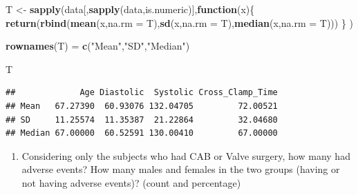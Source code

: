 \documentclass[]{book}
\newenvironment{Shaded}{\begin{snugshade}}{\end{snugshade}}
\newcommand{\CommentTok}[1]{\textcolor[rgb]{0.56,0.35,0.01}{\textit{#1}}}
\newcommand{\ControlFlowTok}[1]{\textcolor[rgb]{0.13,0.29,0.53}{\textbf{#1}}}
\newcommand{\DataTypeTok}[1]{\textcolor[rgb]{0.13,0.29,0.53}{#1}}
\newcommand{\KeywordTok}[1]{\textcolor[rgb]{0.13,0.29,0.53}{\textbf{#1}}}
\newcommand{\NormalTok}[1]{#1}
\newcommand{\OperatorTok}[1]{\textcolor[rgb]{0.81,0.36,0.00}{\textbf{#1}}}
\newcommand{\StringTok}[1]{\textcolor[rgb]{0.31,0.60,0.02}{#1}}
\providecommand{\tightlist}{%
  \setlength{\itemsep}{0pt}\setlength{\parskip}{0pt}}
\begin{document}
\begin{Shaded}
\begin{Highlighting}[]
\NormalTok{T <-}\StringTok{ }\KeywordTok{sapply}\NormalTok{(data[,}\KeywordTok{sapply}\NormalTok{(data,is.numeric)],}\ControlFlowTok{function}\NormalTok{(x)\{}
  \KeywordTok{return}\NormalTok{(}\KeywordTok{rbind}\NormalTok{(}\KeywordTok{mean}\NormalTok{(x,}\DataTypeTok{na.rm =}\NormalTok{ T),}\KeywordTok{sd}\NormalTok{(x,}\DataTypeTok{na.rm =}\NormalTok{ T),}\KeywordTok{median}\NormalTok{(x,}\DataTypeTok{na.rm =}\NormalTok{ T)))}
\NormalTok{  \}}
\NormalTok{  )}

\KeywordTok{rownames}\NormalTok{(T) =}\StringTok{ }\KeywordTok{c}\NormalTok{(}\StringTok{"Mean"}\NormalTok{,}\StringTok{"SD"}\NormalTok{,}\StringTok{"Median"}\NormalTok{)}

\NormalTok{T}
\end{Highlighting}
\end{Shaded}

\begin{verbatim}
##             Age Diastolic  Systolic Cross_Clamp_Time
## Mean   67.27390  60.93076 132.04705         72.00521
## SD     11.25574  11.35387  21.22864         32.04680
## Median 67.00000  60.52591 130.00410         67.00000
\end{verbatim}

\begin{enumerate}
\def\labelenumi{\arabic{enumi}.}
\setcounter{enumi}{2}
\tightlist
\item
  Considering only the subjects who had CAB or Valve surgery, how many had adverse events? How many males and females in the two groups (having or not having adverse events)? (count and percentage)
\end{enumerate}

\begin{Shaded}
\end{Shaded}
\end{document}

